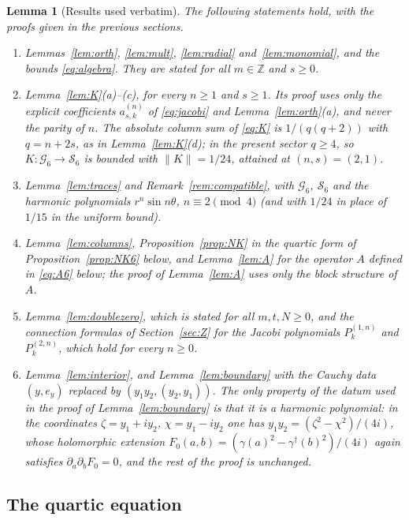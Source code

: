 \documentclass[11pt]{amsart}
\newtheorem{lemma}[theorem]{Lemma}
\theoremstyle{definition}
\theoremstyle{remark}
\numberwithin{equation}{section}
\newcommand{\Z}{\mathbb{Z}}
\newcommand{\Sc}{\mathcal{S}}
\newcommand{\Gc}{\mathcal{G}}
\newcommand{\nrm}[1]{\lVert #1\rVert}
\begin{document}
\begin{lemma}[Results used verbatim]\label{lem:carry}
\sloppy The following statements hold, with the proofs given in the previous sections.
\begin{enumerate}[label=\textup{(\alph*)}]
\item Lemmas~\ref{lem:orth}, \ref{lem:mult}, \ref{lem:radial} and~\ref{lem:monomial}, and the bounds \eqref{eq:algebra}. They are stated for all $m\in\Z$ and $s\geq0$.
\item Lemma~\ref{lem:K}(a)--(c), for every $n\geq1$ and $s\geq1$. Its proof uses only the explicit coefficients $a^{(n)}_{s,k}$ of \eqref{eq:jacobi} and Lemma~\ref{lem:orth}(a), and never the parity of $n$. The absolute column sum of \eqref{eq:K} is $1/(q(q+2))$ with $q=n+2s$, as in Lemma~\ref{lem:K}(d); in the present sector $q\geq4$, so $K\colon\Gc_6\to\Sc_6$ is bounded with $\nrm K=1/24$, attained at $(n,s)=(2,1)$.
\item Lemma~\ref{lem:traces} and Remark~\ref{rem:compatible}, with $\Gc_6$, $\Sc_6$ and the harmonic polynomials $r^n\sin n\theta$, $n\equiv2\pmod4$ (and with $1/24$ in place of $1/15$ in the uniform bound).
\item Lemma~\ref{lem:columns}, Proposition~\ref{prop:NK} in the quartic form of Proposition~\ref{prop:NK6} below, and Lemma~\ref{lem:A} for the operator $A$ defined in \eqref{eq:A6} below; the proof of Lemma~\ref{lem:A} uses only the block structure of $A$.
\item Lemma~\ref{lem:doublezero}, which is stated for all $m,t,N\geq0$, and the connection formulas of Section~\ref{sec:Z} for the Jacobi polynomials $P^{(1,n)}_k$ and $P^{(2,n)}_k$, which hold for every $n\geq0$.
\item Lemma~\ref{lem:interior}, and Lemma~\ref{lem:boundary} with the Cauchy data $(y,e_y)$ replaced by $(y_1y_2,(y_2,y_1))$. The only property of the datum used in the proof of Lemma~\ref{lem:boundary} is that it is a harmonic polynomial: in the coordinates $\zeta=y_1+iy_2$, $\chi=y_1-iy_2$ one has $y_1y_2=(\zeta^2-\chi^2)/(4i)$, whose holomorphic extension $F_0(a,b)=(\gamma(a)^2-\gamma^\dagger(b)^2)/(4i)$ again satisfies $\partial_a\partial_bF_0=0$, and the rest of the proof is unchanged.
\end{enumerate}
\end{lemma}

\subsection{The quartic equation}
\end{document}
